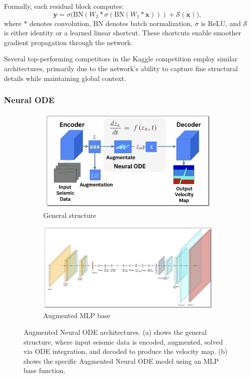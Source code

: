 \documentclass{article}
\begin{document}
Formally, each residual block computes:
\[
\mathbf{y} = \sigma\bigl(\mathrm{BN}(W_2 * \sigma(\mathrm{BN}(W_1 * \mathbf{x}))) + \mathcal{S}(\mathbf{x})\bigr),
\]
where \( * \) denotes convolution, \(\mathrm{BN}\) denotes batch normalization, \(\sigma\) is ReLU, and \(\mathcal{S}\) is either identity or a learned linear shortcut. These shortcuts enable smoother gradient propagation through the network.

Several top-performing competitors in the Kaggle competition employ similar architectures, primarily due to the network's ability to capture fine structural details while maintaining global context.

\subsubsection{Neural ODE}
\begin{figure}
    \centering
    \begin{subfigure}[b]{0.47\linewidth}
        \centering
        \includegraphics[width=\linewidth]{figures/neuralode_structure.png}
        \caption{General structure}
    \end{subfigure}
    \hfill
    \begin{subfigure}[b]{0.47\linewidth}
        \centering
        \includegraphics[width=\linewidth]{figures/augmented_neuralode.png}
        \caption{Augmented MLP base}
    \end{subfigure}
    \caption{Augmented Neural ODE architectures. (a) shows the general structure, where input seismic data is encoded, augmented, solved via ODE integration, and decoded to produce the velocity map. (b) shows the specific Augmented Neural ODE model using an MLP base function.}
    \label{fig:neuralode-merged}
\end{figure}
\end{document}
